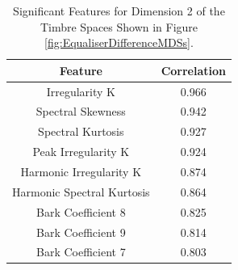 		\begin{table}[h!]
			\centering
			\begin{tabular}{|c|c|}
				\hline
				\bf{Feature} & \bf{Correlation} \\
				\hline
				\hline
				Irregularity K & 0.966 \\
				\hline
				Spectral Skewness & 0.942 \\
				\hline
				Spectral Kurtosis & 0.927 \\
				\hline
				Peak Irregularity K & 0.924 \\
				\hline
				Harmonic Irregularity K & 0.874 \\
				\hline
				Harmonic Spectral Kurtosis & 0.864 \\
				\hline
				Bark Coefficient 8 & 0.825 \\
				\hline
				Bark Coefficient 9 & 0.814 \\
				\hline
				Bark Coefficient 7 & 0.803 \\
				\hline
			\end{tabular}
			\caption{Significant Features for Dimension 2 of the Timbre Spaces Shown in Figure 
				 \ref{fig:EqualiserDifferenceMDSs}.}
			\label{tab:EqualiserDifferenceFeatures}
		\end{table}
